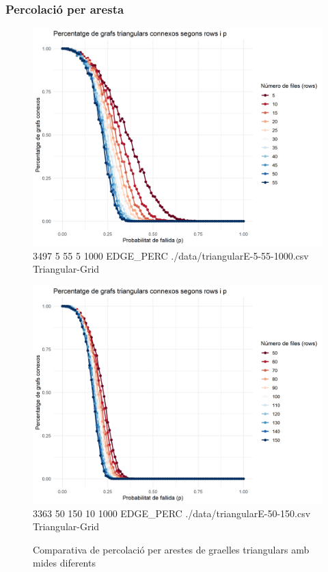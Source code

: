 \documentclass[a4paper]{article}
\begin{document}
	
	\subsubsection{Percolació per aresta}
	
	\begin{figure}[H]
		\centering
		\begin{minipage}{0.45\textwidth}
			\centering
			\includegraphics[width=\textwidth]{images/triangularE-5-55-1000}
			\footnotesize{3497 5 55 5 1000 EDGE\_PERC ./data/triangularE-5-55-1000.csv Triangular-Grid}
		\end{minipage}
		\hfill
		\begin{minipage}{0.45\textwidth}
			\centering
			\includegraphics[width=\textwidth]{images/triangularE-50-150}
			\footnotesize{3363 50 150 10 1000 EDGE\_PERC ./data/triangularE-50-150.csv Triangular-Grid}
		\end{minipage}
		\caption{Comparativa de percolació per arestes de graelles triangulars amb mides diferents}
		\label{fig:percolation_edges_triangular}
	\end{figure}
	
\end{document}
